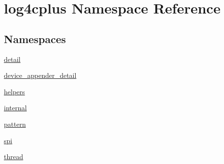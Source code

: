 \hypertarget{namespacelog4cplus}{\section{log4cplus Namespace Reference}
\label{namespacelog4cplus}
}
\subsection*{Namespaces}
\begin{DoxyCompactItemize}
\item 
\hyperlink{namespacelog4cplus_1_1detail}{detail}
\item 
\hyperlink{namespacelog4cplus_1_1device__appender__detail}{device\-\_\-appender\-\_\-detail}
\item 
\hyperlink{namespacelog4cplus_1_1helpers}{helpers}
\item 
\hyperlink{namespacelog4cplus_1_1internal}{internal}
\item 
\hyperlink{namespacelog4cplus_1_1pattern}{pattern}
\item 
\hyperlink{namespacelog4cplus_1_1spi}{spi}
\item 
\hyperlink{namespacelog4cplus_1_1thread}{thread}
\end{DoxyCompactItemize}
